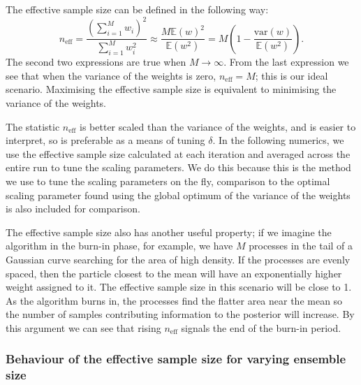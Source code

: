 \documentclass[final]{siamltex}
\newcommand{\neff}{n_{\text{eff}}}
\newcommand{\E}{{\mathbb E}}
\begin{document}
The effective sample size can be defined in the following way:
\[
	\neff = \frac{\left(\sum_{i=1}^M \! w_i\right)^2}{\sum_{i=1}^M \! w_i^2} \approx \frac{M\E(w)^2}{\E(w^2)} = M\left(1 - \frac{\mbox{var}(w)}{\mathbb{E}(w^2)}\right).
\]
The second two expressions are true when $M\rightarrow\infty$. From
the last expression we see that when the variance of the weights is
zero, $\neff = M$; this is our ideal scenario. Maximising the effective sample size is equivalent to minimising the variance of the weights.

The statistic $\neff$ is better scaled than the variance of the weights, and is easier to interpret, so is preferable as a means of tuning $\delta$. In the following numerics, we use the effective sample size calculated at each iteration and averaged across the entire run to tune the scaling parameters. We do this because this is the method we use to tune the scaling parameters on the fly, comparison to the optimal scaling parameter found using the global optimum of the variance of the weights is also included for comparison.

The effective sample size also has another useful property; if we imagine the algorithm in the burn-in phase, for example, we have $M$ processes in the tail of a Gaussian curve searching for the area of high density. If the processes are evenly spaced, then the particle closest to the mean will have an exponentially higher weight assigned to it. The effective sample size in this scenario will be close to 1. As the algorithm burns in, the processes find the flatter area near the mean so the number of samples contributing information to the posterior will increase. By this argument we can see that rising $\neff$ signals the end of the burn-in period.

\subsubsection{Behaviour of the effective sample size for varying ensemble size}
\end{document}
